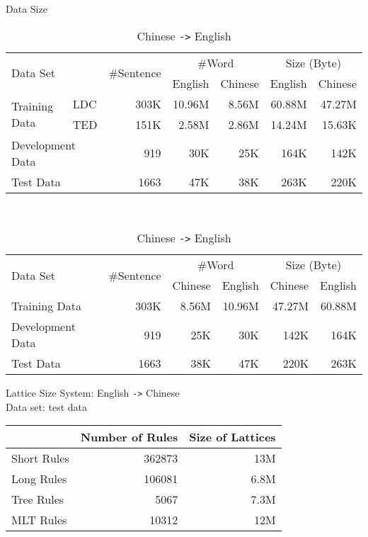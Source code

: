 \documentclass[18pt]{beamer}
\begin{document}
\begin{frame}{Data Size}

\begin{table}
\centering
\small
\caption{English \texttt{->} Chinese}
\begin{tabular}{|ll|r|r|r|r|r|}
\hline
\multicolumn{2}{|l|}{\multirow{2}{*}{Data Set}} & \multirow{2}{*}{\#Sentence} & \multicolumn{2}{c|}{\#Word} & \multicolumn{2}{c|}{Size (Byte)}\\ \cline{4-7}
& & & English & Chinese & English & Chinese \\
\hline
\multirow{2}{*}{Training Data} & \multicolumn{1}{|l|}{LDC} & 303K & 10.96M & 8.56M & 60.88M & 47.27M \\ \cline{2-7}
& \multicolumn{1}{|l|}{TED} & 151K & 2.58M & 2.86M & 14.24M & 15.63K \\ \hline
\multicolumn{2}{|l|}{Development Data} & 919 & 30K & 25K & 164K & 142K \\ \hline
\multicolumn{2}{|l|}{Test Data} & 1663 & 47K & 38K & 263K & 220K \\ \hline
\end{tabular}\bigskip\\
\caption{Chinese \texttt{->} English}
\begin{tabular}{|l|r|r|r|r|r|}
\hline
\multirow{2}{*}{Data Set} & \multirow{2}{*}{\#Sentence} & \multicolumn{2}{c|}{\#Word} & \multicolumn{2}{c|}{Size (Byte)}\\ \cline{3-6}
& & Chinese & English & Chinese & English \\
\hline
Training Data & 303K & 8.56M & 10.96M & 47.27M & 60.88M\\ \hline
Development Data & 919 & 25K & 30K & 142K & 164K \\ \hline
Test Data & 1663 & 38K & 47K & 220K & 263K \\ \hline
\end{tabular}
\end{table}
\end{frame}

\begin{frame}{Lattice Size}
System: English \texttt{->} Chinese\\
Data set: test data
\begin{table}
\begin{tabular}{|l|r|r|}
\hline
& Number of Rules & Size of Lattices \\ \hline
Short Rules & 362873 & 13M \\ \hline
Long Rules & 106081 & 6.8M \\ \hline
Tree Rules & 5067 & 7.3M\\ \hline
MLT Rules & 10312 & 12M \\ \hline
\end{tabular}
\end{table}
\end{frame}
\end{document}
